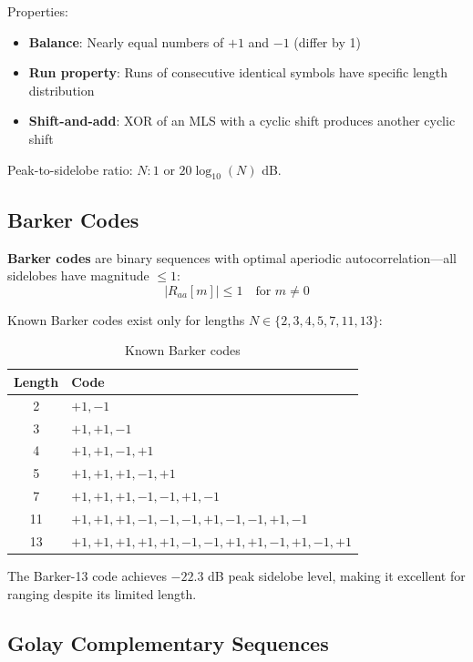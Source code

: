 \documentclass[11pt]{article}
\begin{document}
Properties:
\begin{itemize}
    \item \textbf{Balance}: Nearly equal numbers of $+1$ and $-1$ (differ by 1)
    \item \textbf{Run property}: Runs of consecutive identical symbols have specific length distribution
    \item \textbf{Shift-and-add}: XOR of an MLS with a cyclic shift produces another cyclic shift
\end{itemize}

Peak-to-sidelobe ratio: $N : 1$ or $20\log_{10}(N)$ dB.

\subsection{Barker Codes}

\textbf{Barker codes} are binary sequences with optimal aperiodic autocorrelation---all sidelobes have magnitude $\leq 1$:
\begin{equation}
|R_{aa}[m]| \leq 1 \quad \text{for } m \neq 0
\end{equation}

Known Barker codes exist only for lengths $N \in \{2, 3, 4, 5, 7, 11, 13\}$:

\begin{table}[h]
\centering
\begin{tabular}{cl}
\toprule
\textbf{Length} & \textbf{Code} \\
\midrule
2 & $+1, -1$ \\
3 & $+1, +1, -1$ \\
4 & $+1, +1, -1, +1$ \\
5 & $+1, +1, +1, -1, +1$ \\
7 & $+1, +1, +1, -1, -1, +1, -1$ \\
11 & $+1, +1, +1, -1, -1, -1, +1, -1, -1, +1, -1$ \\
13 & $+1, +1, +1, +1, +1, -1, -1, +1, +1, -1, +1, -1, +1$ \\
\bottomrule
\end{tabular}
\caption{Known Barker codes}
\end{table}

The Barker-13 code achieves $-22.3$ dB peak sidelobe level, making it excellent for ranging despite its limited length.

\subsection{Golay Complementary Sequences}
\end{document}
